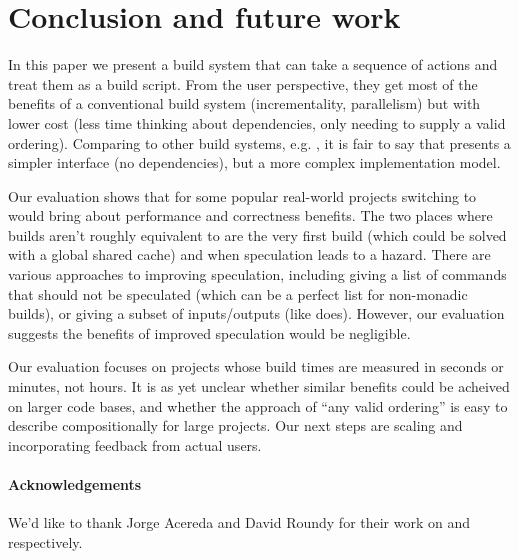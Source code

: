 \section{Conclusion and future work}
\label{sec:conclusion}

In this paper we present a build system that can take a sequence of actions and treat them as a build script. From the user perspective, they get most of the benefits of a conventional build system (incrementality, parallelism) but with lower cost (less time thinking about dependencies, only needing to supply a valid ordering). Comparing \Rattle to other build systems, e.g. \Make, it is fair to say that \Rattle presents a simpler interface (no dependencies), but a more complex implementation model.

Our evaluation shows that for some popular real-world projects switching to \Rattle would bring about performance and correctness benefits. The two places where builds aren't roughly equivalent to \Make are the very first build (which could be solved with a global shared cache) and when speculation leads to a hazard. There are various approaches to improving speculation, including giving a list of commands that should not be speculated (which can be a perfect list for non-monadic builds), or giving a subset of inputs/outputs (like \Fac does). However, our evaluation suggests the benefits of improved speculation would be negligible.

Our evaluation focuses on projects whose build times are measured in seconds or minutes, not hours. It is as yet unclear whether similar benefits could be acheived on larger code bases, and whether the \Rattle approach of ``any valid ordering'' is easy to describe compositionally for large projects. Our next steps are scaling \Rattle and incorporating feedback from actual users.

\paragraph{Acknowledgements} We'd like to thank Jorge Acereda and David Roundy for their work on \Fsatrace and \Bigbro respectively.
